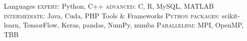 \begin{cvskills}
  \cvskill
    {Languages} %
    {\textsc{expert}: Python, C++ \quad \textsc{advanced}: C, R, MySQL, MATLAB \quad \textsc{intermediate}: Java, Cuda, PHP} %
  \cvskill
    {Tools \& Frameworks} %
    {\textsc{Python packages}: scikit-learn, TensorFlow, Keras, pandas, NumPy, numba \quad \textsc{Parallelism}: MPI, OpenMP, TBB} %
\end{cvskills}
